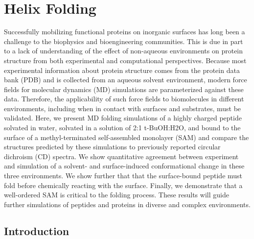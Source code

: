\chapter{Helix Folding}\label{helix-folding}

Successfully mobilizing functional proteins on inorganic surfaces has long been a challenge to the biophysics and bioengineering communities. 
This is due in part to a lack of understanding of the effect of non-aqueous environments on protein structure from both experimental and computational perspectives. 
Because most experimental information about protein structure comes from the protein data bank (PDB) and is collected from an aqueous solvent environment, modern force fields for molecular dynamics (MD) simulations are parameterized against these data. 
Therefore, the applicability of such force fields to biomolecules in different environments, including when in contact with surfaces and substrates, must be validated. 
Here, we present MD folding simulations of a highly charged peptide solvated in water, solvated in a solution of 2:1 t-BuOH:H2O, and bound to the surface of a methyl-terminated self-assembled monolayer (SAM) and compare the structures predicted by these simulations to previously reported circular dichroism (CD) spectra. 
We show quantitative agreement between experiment and simulation of a solvent- and surface-induced conformational change in these three environments. 
We show further that that the surface-bound peptide must fold before chemically reacting with the surface. 
Finally, we demonstrate that a well-ordered SAM is critical to the folding process. 
These results will guide further simulations of peptides and proteins in diverse and complex environments.

\section{Introduction}
%

